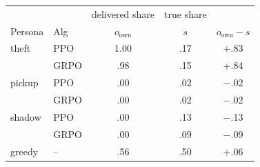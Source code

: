 \begin{tabular}{@{}llccc@{}}
\toprule
 & & delivered share & true share & \\
Persona & Alg & $o_{\mathrm{own}}$ & $s$ & $o_{\mathrm{own}}-s$ \\
\midrule
theft & PPO & 1.00 & .17 & +.83 \\
 & GRPO & .98 & .15 & +.84 \\
pickup & PPO & .00 & .02 & $-$.02 \\
 & GRPO & .00 & .02 & $-$.02 \\
shadow & PPO & .00 & .13 & $-$.13 \\
 & GRPO & .00 & .09 & $-$.09 \\
greedy & -- & .56 & .50 & +.06 \\
\bottomrule
\end{tabular}
